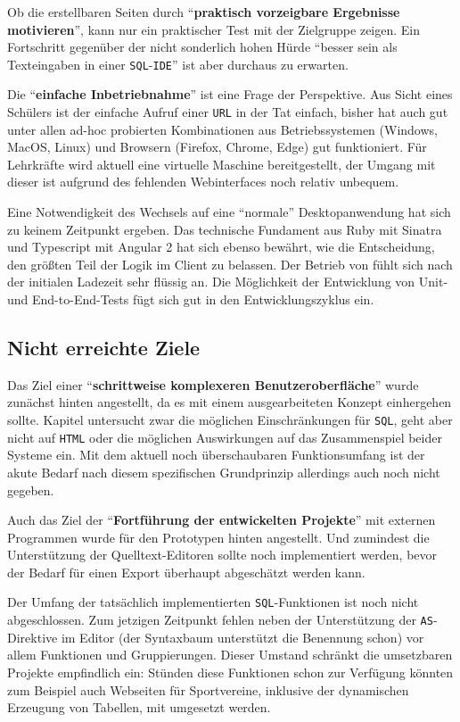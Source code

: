 Ob die erstellbaren Seiten durch "`\textbf{praktisch vorzeigbare Ergebnisse motivieren}"', kann nur ein praktischer Test mit der Zielgruppe zeigen. Ein Fortschritt gegenüber der nicht sonderlich hohen Hürde "`besser sein als Texteingaben in einer \texttt{SQL}-\texttt{IDE}"' ist aber durchaus zu erwarten.

Die "`\textbf{einfache Inbetriebnahme}"' ist eine Frage der Perspektive. Aus Sicht eines Schülers ist der einfache Aufruf einer \texttt{URL} in der Tat einfach, bisher hat \idename{} auch gut unter allen ad-hoc probierten Kombinationen aus Betriebssystemen (Windows, Mac\-OS, Linux) und Browsern (Firefox, Chrome, Edge) gut funktioniert. Für Lehrkräfte wird aktuell eine virtuelle Maschine bereitgestellt, der Umgang mit dieser ist aufgrund des fehlenden Webinterfaces noch relativ unbequem.

Eine Notwendigkeit des Wechsels auf eine "`normale"' Desktopanwendung hat sich zu keinem Zeitpunkt ergeben. Das technische Fundament aus Ruby mit Sinatra und Typescript mit Angular 2 hat sich ebenso bewährt, wie die Entscheidung, den größten Teil der Logik im Client zu belassen. Der Betrieb von \idename{} fühlt sich nach der initialen Ladezeit sehr flüssig an. Die Möglichkeit der Entwicklung von Unit- und End-to-End-Tests fügt sich gut in den Entwicklungszyklus ein.

\subsection{Nicht erreichte Ziele}

Das Ziel einer "`\textbf{schrittweise komplexeren Benutzeroberfläche}"' wurde zunächst hinten angestellt, da es mit einem ausgearbeiteten Konzept einhergehen sollte. Kapitel  untersucht zwar die möglichen Einschränkungen für \texttt{SQL}, geht aber nicht auf \texttt{HTML} oder die möglichen Auswirkungen auf das Zusammenspiel beider Systeme ein. Mit dem aktuell noch überschaubaren Funktionsumfang ist der akute Bedarf nach diesem spezifischen Grundprinzip allerdings auch noch nicht gegeben.

Auch das Ziel der "`\textbf{Fortführung der entwickelten Projekte}"' mit externen Programmen wurde für den Prototypen hinten angestellt. Und zumindest die Unterstützung der Quelltext-Editoren sollte noch implementiert werden, bevor der Bedarf für einen Export überhaupt abgeschätzt werden kann.

Der Umfang der tatsächlich implementierten \texttt{SQL}-Funktionen ist noch nicht abgeschlossen. Zum jetzigen Zeitpunkt fehlen neben der Unterstützung der \texttt{AS}-Direktive im Editor (der Syntaxbaum unterstützt die Benennung schon) vor allem Funktionen und Gruppierungen. Dieser Umstand schränkt die umsetzbaren Projekte empfindlich ein: Stünden diese Funktionen schon zur Verfügung könnten zum Beispiel auch Webseiten für Sportvereine, inklusive der dynamischen Erzeugung von Tabellen, mit \idename{} umgesetzt werden.

